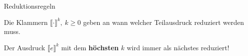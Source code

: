 \newcommand{\COURSE}{Praktische Informatik 1: Reduktionsregeln}
\newcommand{\TUTOR}{Alexander \textsc{Phi.} Goetz}



\newcommand{\reduction}[1]{\texttt{\textbf{[#1]}}}

\setlength{\parindent}{0pt}



\begin{center}
	\LARGE Reduktionsregeln
\end{center}



\noindent Die Klammern $\llbracket\cdot\rrbracket^k,\ k \geq 0$ geben an wann
welcher Teilausdruck reduziert werden muss.

Der Ausdruck $\llbracket e\rrbracket^k$ mit dem \textbf{höchsten} $k$ wird
immer als nächstes reduziert!

